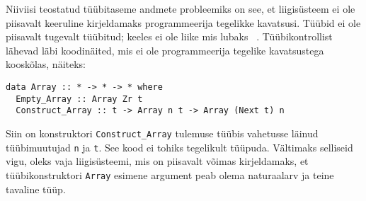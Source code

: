 \documentclass[12pt]{article}
\begin{document}
\begin{comment}
  \begin{frame}[fragile]{Some Uses of Type-Level Data}
    \begin{kood}{Multidimensional Vectors}
      \begin{verbatim}
data Multivec :: * -> * -> * where
  ZDimensional :: t -> Multivec LNil t
  NDimensional ::
    Vec n (Multivec l t) -> Multivec (LCons n l) t\end{verbatim}
    \end{kood}
  \end{frame}
  \begin{frame}{Why Type-Level Data?}
    \begin{itemize}
      \item
        More type safety.
      \item
        Less boilerplate code.
      \item
        More descriptive types.
    \end{itemize}
  \end{frame}
\end{comment}

      Niiviisi teostatud tüübitaseme andmete probleemiks on see, et liigisüsteem ei ole piisavalt keeruline kirjeldamaks programmeerija tegelikke kavatsusi. Tüübid ei ole piisavalt tugevalt tüübitud; keeles ei ole liike mis lubaks ~\cite{Giv}. Tüübikontrollist lähevad läbi koodinäited, mis ei ole programmeerija tegelike kavatsustega kooskõlas, näiteks:

      \begin{verbatim}data Array :: * -> * -> * where
  Empty_Array :: Array Zr t
  Construct_Array :: t -> Array n t -> Array (Next t) n\end{verbatim}

      Siin on konstruktori \verb!Construct_Array! tulemuse tüübis vahetusse läinud tüübimuutujad \verb!n! ja \verb!t!. See kood ei tohiks tegelikult tüüpuda. Vältimaks selliseid vigu, oleks vaja liigisüsteemi, mis on piisavalt võimas kirjeldamaks, et tüübikonstruktori \verb!Array! esimene argument peab olema naturaalarv ja teine tavaline tüüp.
\end{document}
